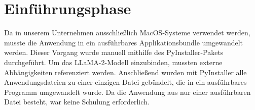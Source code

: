 \section{Einführungsphase}
\label{sec:Einfuehrungsphase}
Da in unserem Unternehmen ausschließlich MacOS-Systeme verwendet werden, musste die Anwendung
in ein ausführbares Applikationsbundle umgewandelt werden. Dieser Vorgang wurde manuell
mithilfe des PyInstaller-Pakets durchgeführt. Um das \ac{LLaMA}-2-Modell einzubinden,
mussten externe Abhängigkeiten referenziert werden. Anschließend wurden mit PyInstaller 
alle Anwendungsdateien zu einer einzigen Datei gebündelt, die in ein ausführbares 
Programm umgewandelt wurde. Da die Anwendung aus nur einer ausführbaren Datei besteht,
war keine Schulung erforderlich.